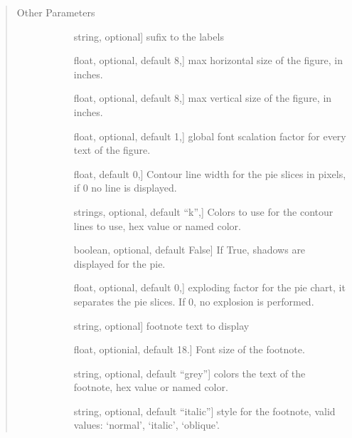 \documentclass[letterpaper,10pt,english]{sphinxmanual}
\begin{document}
\begin{fulllineitems}
\begin{quote}
\begin{description}
\begin{description}
\end{description}

\item[{Other Parameters}] \leavevmode\begin{description}
\item[{}] \leavevmode{[}string, optional{]}
sufix to the labels

\item[{}] \leavevmode{[}float, optional, default 8,{]}
max horizontal size of the figure, in inches.

\item[{}] \leavevmode{[}float, optional, default 8,{]}
max vertical size of the figure, in inches.

\item[{}] \leavevmode{[}float, optional, default 1,{]}
global font scalation factor for every text of the figure.

\item[{}] \leavevmode{[}float, default 0,{]}
Contour line width for the pie slices 
in pixels, if 0 no line is displayed.

\item[{}] \leavevmode{[}strings, optional, default “k”,{]}
Colors to use for the contour lines to use, 
hex value or named color.

\item[{}] \leavevmode{[}boolean, optional, default False{]}
If True, shadows are displayed for the pie.

\item[{}] \leavevmode{[}float, optional, default 0,{]}
exploding factor for the pie chart, it separates the pie slices.
If 0, no explosion is performed.

\item[{}] \leavevmode{[}string, optional{]}
footnote text to display

\item[{}] \leavevmode{[}float, optionial, default 18.{]}
Font size of the footnote.

\item[{}] \leavevmode{[}string, optional, default “grey”{]}
colors the text of the footnote, hex value or named color.

\item[{}] \leavevmode{[}string, optional, default “italic”{]}
style for the footnote, 
valid values: ‘normal’, ‘italic’, ‘oblique’.


\end{description}
\end{description}
\end{quote}
\end{fulllineitems}
\end{document}
